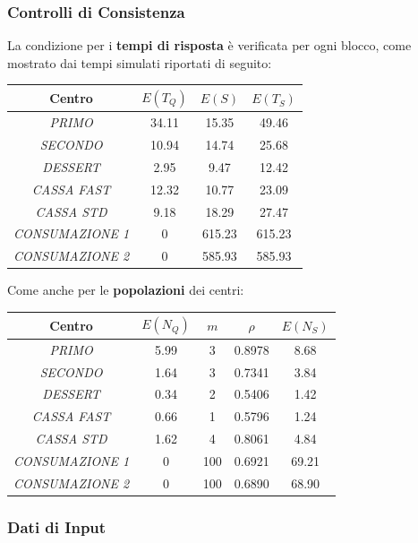 \documentclass{article}
\newcommand\mP{3}
\newcommand\mS{3}
\newcommand\mD{2}
\newcommand\mF{1}
\newcommand\mC{4}
\begin{document}
\subsubsection{Controlli di Consistenza}
 
La condizione per i \textbf{tempi di risposta} è verificata per ogni blocco, come mostrato dai tempi simulati riportati di seguito:
\begin{center}
\begin{tabular}{|c|c|c|c|}
 \hline
 \textbf{Centro} & \textbf{$E(T_{Q})$} & \textbf{$E(S)$} & \textbf{$E(T_{S})$}\\
 \hline
 \textit{PRIMO} & 34.11 & 15.35 & 49.46 \\
 \hline
 \textit{SECONDO} & 10.94 & 14.74 & 25.68\\
 \hline
 \textit{DESSERT} & 2.95 & 9.47 & 12.42\\
 \hline
 \textit{CASSA FAST} & 12.32 & 10.77 & 23.09\\
 \hline
 \textit{CASSA STD} & 9.18 & 18.29 & 27.47\\
 \hline
 \textit{CONSUMAZIONE 1} & 0 & 615.23 & 615.23\\
 \hline
 \textit{CONSUMAZIONE 2} & 0 & 585.93 & 585.93\\
 \hline
\end{tabular}
\end{center}
Come anche per le \textbf{popolazioni} dei centri:
\begin{center}
\begin{tabular}{|c|c|c|c|c|}
 \hline
 \textbf{Centro} & $E(N_{Q})$ & $m$ & $\rho$ & $E(N_{S})$\\
 \hline
 \textit{PRIMO} & 5.99 & \mP & 0.8978 & 8.68\\
 \hline
 \textit{SECONDO} & 1.64 & \mS & 0.7341 & 3.84\\
 \hline
 \textit{DESSERT} & 0.34 & \mD & 0.5406 & 1.42\\
 \hline
 \textit{CASSA FAST} & 0.66 & \mF & 0.5796 & 1.24\\
 \hline
 \textit{CASSA STD} & 1.62 & \mC & 0.8061 & 4.84\\
 \hline
 \textit{CONSUMAZIONE 1} & 0 & 100 & 0.6921 & 69.21\\
 \hline
 \textit{CONSUMAZIONE 2} & 0 & 100 & 0.6890 & 68.90\\
 \hline
\end{tabular}
\end{center}

\subsubsection{Dati di Input}
\end{document}
